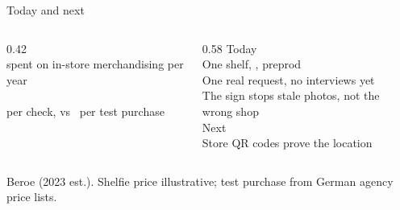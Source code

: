 \begin{frame}{Today and next}
  \begin{columns}[T]
    \begin{column}{0.42\textwidth}\centering
      {\fontsize{28}{32}\selectfont\bfseries\color{cardano}\MarketServices}\\[0.1em]
      {\scriptsize spent on in-store merchandising per year}\\[0.8em]
      {\fontsize{22}{26}\selectfont\bfseries\color{cardano}\PricePerStore}\\[0.1em]
      {\scriptsize per check, vs \CostPerVisit\ per test purchase}
    \end{column}
    \begin{column}{0.58\textwidth}\small
      \alert{Today}\\
      One shelf, \City, preprod\\
      One real request, no interviews yet\\
      The sign stops stale photos, not the wrong shop\\[0.6em]
      \alert{Next}\\
      Store QR codes prove the location
    \end{column}
  \end{columns}
  \vfill
  {\centering\tiny Beroe (2023 est.). Shelfie price illustrative; test purchase from German agency price lists.\par}
\end{frame}
